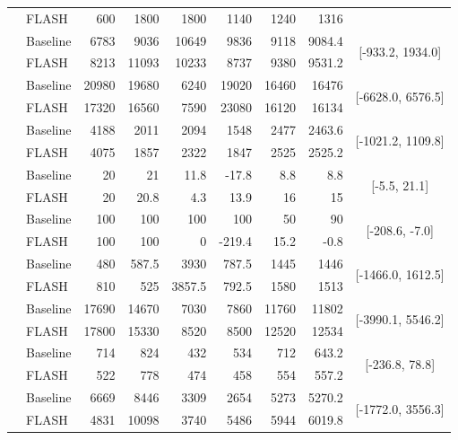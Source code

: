 \documentclass{article} %
\begin{document}
\begin{table}[H]
{\begin{tabular}{@{}ll*{5}{r}rc@{}}
 & FLASH & 600 & 1800 & 1800 & 1140 & 1240 & 1316 &  \\
\addlinespace[1pt]
\multirow{2}{*}{Krull} & Baseline & 6783 & 9036 & 10649 & 9836 & 9118 & 9084.4 & \multirow{2}{*}{[-933.2, 1934.0]} \\
 & FLASH & 8213 & 11093 & 10233 & 8737 & 9380 & 9531.2 &  \\
\addlinespace[1pt]
\multirow{2}{*}{KungFuMaster} & Baseline & 20980 & 19680 & 6240 & 19020 & 16460 & 16476 & \multirow{2}{*}{[-6628.0, 6576.5]} \\
 & FLASH & 17320 & 16560 & 7590 & 23080 & 16120 & 16134 &  \\
\addlinespace[1pt]
\multirow{2}{*}{MsPacman} & Baseline & 4188 & 2011 & 2094 & 1548 & 2477 & 2463.6 & \multirow{2}{*}{[-1021.2, 1109.8]} \\
 & FLASH & 4075 & 1857 & 2322 & 1847 & 2525 & 2525.2 &  \\
\addlinespace[1pt]
\multirow{2}{*}{Pong} & Baseline & 20 & 21 & 11.8 & -17.8 & 8.8 & 8.8 & \multirow{2}{*}{[-5.5, 21.1]} \\
 & FLASH & 20 & 20.8 & 4.3 & 13.9 & 16 & 15 &  \\
\addlinespace[1pt]
\multirow{2}{*}{PrivateEye} & Baseline & 100 & 100 & 100 & 100 & 50 & 90 & \multirow{2}{*}{[-208.6, -7.0]} \\
 & FLASH & 100 & 100 & 0 & -219.4 & 15.2 & -0.8 &  \\
\addlinespace[1pt]
\multirow{2}{*}{Qbert} & Baseline & 480 & 587.5 & 3930 & 787.5 & 1445 & 1446 & \multirow{2}{*}{[-1466.0, 1612.5]} \\
 & FLASH & 810 & 525 & 3857.5 & 792.5 & 1580 & 1513 &  \\
\addlinespace[1pt]
\multirow{2}{*}{RoadRunner} & Baseline & 17690 & 14670 & 7030 & 7860 & 11760 & 11802 & \multirow{2}{*}{[-3990.1, 5546.2]} \\
 & FLASH & 17800 & 15330 & 8520 & 8500 & 12520 & 12534 &  \\
\addlinespace[1pt]
\multirow{2}{*}{Seaquest} & Baseline & 714 & 824 & 432 & 534 & 712 & 643.2 & \multirow{2}{*}{[-236.8, 78.8]} \\
 & FLASH & 522 & 778 & 474 & 458 & 554 & 557.2 &  \\
\addlinespace[1pt]
\multirow{2}{*}{UpNDown} & Baseline & 6669 & 8446 & 3309 & 2654 & 5273 & 5270.2 & \multirow{2}{*}{[-1772.0, 3556.3]} \\
 & FLASH & 4831 & 10098 & 3740 & 5486 & 5944 & 6019.8 &  \\
\bottomrule
\end{tabular}
}
\end{table}
\end{document}
